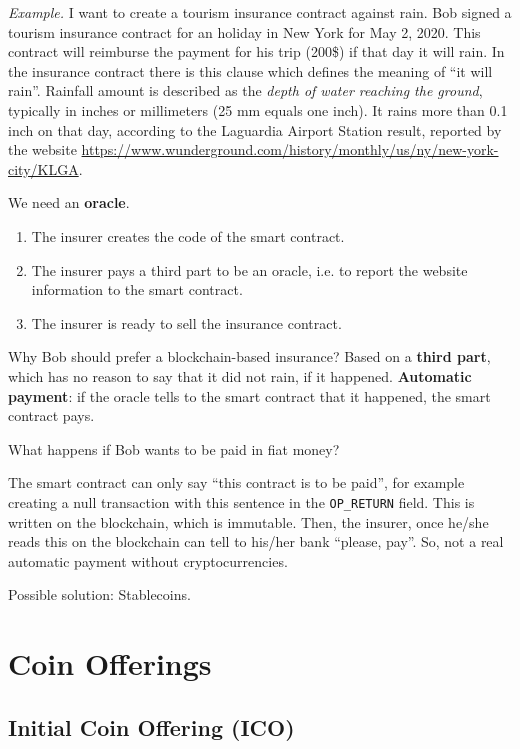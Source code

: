 \emph{Example.} I want to create a tourism insurance contract against rain. Bob signed a tourism insurance contract for an holiday in New York for May 2, 2020. This contract will reimburse the payment for his trip (200\$) if that day it will rain. In the insurance contract there is this clause which defines the meaning of ``it will rain''. Rainfall amount is described as the \emph{depth of water reaching the ground}, typically in inches or millimeters (25 mm equals one inch). It rains more than 0.1 inch on that day, according to the Laguardia Airport Station result, reported by the website \url{https://www.wunderground.com/history/monthly/us/ny/new-york-city/KLGA}.

We need an \textbf{oracle}.
\begin{enumerate}
	\item The insurer creates the code of the smart contract.
	\item The insurer pays a third part to be an oracle, i.e. to report the website information to the smart contract.
	\item The insurer is ready to sell the insurance contract.
\end{enumerate}

Why Bob should prefer a blockchain-based insurance? Based on a \textbf{third part}, which has no reason to say that it did not rain, if it happened.
\textbf{Automatic payment}: if the oracle tells to the smart contract that it happened, the smart contract pays.

What happens if Bob wants to be paid in fiat money?

The smart contract can only say ``this contract is to be paid'', for example creating a null transaction with this sentence in the \texttt{OP\_RETURN} field. This is written on the blockchain, which is immutable. Then, the insurer, once he/she reads this on the blockchain can tell to his/her bank ``please, pay''.
So, not a real automatic payment without cryptocurrencies.

Possible solution: Stablecoins.

\section{Coin Offerings}

\subsection{Initial Coin Offering (ICO)}

